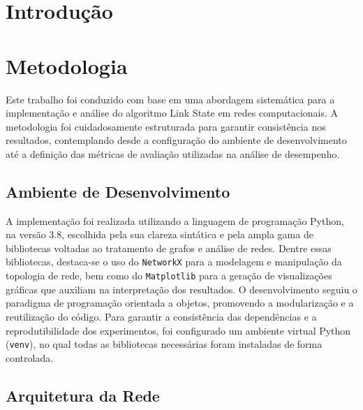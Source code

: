\documentclass[12pt]{article}
\title{}
\author{Daniel Rodrigues de Sousa\inst{1}}
\begin{document}
 
\maketitle

\begin{abstract}

\end{abstract}
     
\begin{resumo} 

\end{resumo}


\section{Introdução}

\section{Metodologia}

Este trabalho foi conduzido com base em uma abordagem sistemática para a implementação e análise do algoritmo Link State em redes computacionais. A metodologia foi cuidadosamente estruturada para garantir consistência nos resultados, contemplando desde a configuração do ambiente de desenvolvimento até a definição das métricas de avaliação utilizadas na análise de desempenho.

\subsection{Ambiente de Desenvolvimento}

A implementação foi realizada utilizando a linguagem de programação Python, na versão 3.8, escolhida pela sua clareza sintática e pela ampla gama de bibliotecas voltadas ao tratamento de grafos e análise de redes. Dentre essas bibliotecas, destaca-se o uso do \texttt{NetworkX} para a modelagem e manipulação da topologia de rede, bem como do \texttt{Matplotlib} para a geração de visualizações gráficas que auxiliam na interpretação dos resultados. O desenvolvimento seguiu o paradigma de programação orientada a objetos, promovendo a modularização e a reutilização do código. Para garantir a consistência das dependências e a reprodutibilidade dos experimentos, foi configurado um ambiente virtual Python (\texttt{venv}), no qual todas as bibliotecas necessárias foram instaladas de forma controlada.

\subsection{Arquitetura da Rede}
\end{document}
